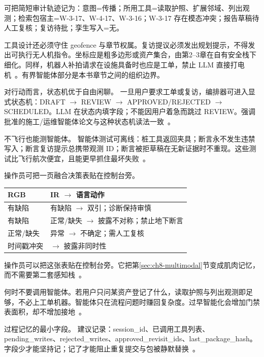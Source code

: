 可把简短审计轨迹记为：意图=传播；所用工具=读取护照、扩展邻域、列出观测；检索包宿主=W-3-17、W-4-17、W-3-16；W-3-17 存在模态冲突；报告草稿待人工复核；复访待批；孪生写入=无。

工具设计还必须守住 geofence 与章节权属。复访提议必须发出规划提示，不得发出可执行无人机指令。坐标应是粗多边形或资产集合，由第2--3章在自有安全栈下细化。同样，机器人补拍请求在设施具备时也应是工单，禁止 LLM 直接打电机~\cite{luo2025llmdtrobot}。有界智能体部分是本书章节之间的组织边界。

对行动而言，状态机优于自由闲聊。 一旦用户要求工单或复访，编排器可进入显式状态机：DRAFT $\rightarrow$ REVIEW $\rightarrow$ APPROVED/REJECTED $\rightarrow$ SCHEDULED。LLM 在状态内填字段；不能因用户着急而跳过 REVIEW。强调批准的施工/运维智能体论文与这种状态机读法一致~\cite{gao2026ifcagent,zhang2025llmagentschema,rawat2025llmmas}。

不飞行也能测智能体。 智能体测试可离线：桩工具返回夹具；断言永不发生违禁写入；断言复访提示总携带观测 ID；断言被拒草稿在无新证据时不重现。这些测试比飞行航次便宜，且能更早抓住最坏失败~\cite{wang2024surveyagents,li2024surveymultiagent}。



操作员可把一页融合决策表贴在控制台旁。
\begin{center}
\begin{tabular}{ll}
\hline
RGB & IR $\rightarrow$ 语言动作 \\
\hline
有缺陷 & 有缺陷 $\rightarrow$ 双引；诊断保持审慎 \\
有缺陷 & 正常/缺失 $\rightarrow$ 披露不对称；禁止地下断言 \\
正常/缺失 & 异常 $\rightarrow$ 不确定；需人工复核 \\
时间戳冲突 & $\rightarrow$ 披露非同时性 \\
\hline
\end{tabular}
\end{center}
\vspace{0.5em}
操作员可以把这张表贴在控制台旁。它把第\ref{sec:ch8-multimodal}节变成肌肉记忆，而不需要第二套感知栈~\cite{zhao2024facade,zhao2026physical}。

何时不要调用智能体。若用户只问某资产登记了什么，读取护照与列出观测即足够，不必上工单机器。智能体只在流程问题时赚回复杂度。过早智能化会增加门禁表面积，却不增加接地~\cite{yao2023react,wang2024surveyagents}。

过程记忆的最小字段。 建议记录：session\_id、已调用工具列表、pending\_writes、rejected\_writes、approved\_revisit\_ids、last\_package\_hash。字段少才能坚持记；记了才能阻止重复提交与包被静默替换~\cite{rawat2025llmmas,gao2026ifcagent}。


